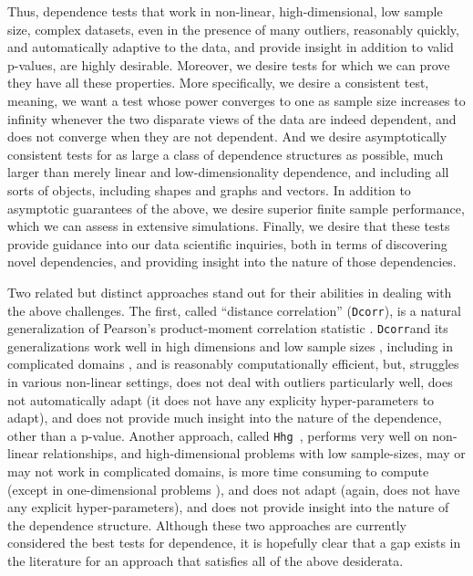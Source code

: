 \documentclass[11pt]{article}
\providecommand{\sct}[1]{{\sc \texttt{#1}}}
\newcommand{\Hhg}{\sct{Hhg}}
\newcommand{\Dcorr}{\sct{Dcorr}}
\begin{document}
Thus, dependence tests that work in non-linear, high-dimensional, low sample size, complex datasets, even in the presence of many outliers, reasonably quickly, and automatically adaptive to the data, and provide insight in addition to valid p-values, are highly desirable. Moreover, we desire tests for which we can prove they have all these properties. More specifically, we desire a consistent test, meaning, we want a test whose power converges to one as sample size increases to infinity whenever the two disparate views of the data are indeed dependent, and does not converge when they are not dependent. And we desire asymptotically consistent tests for as large a class of dependence structures as possible, much larger than merely linear and low-dimensionality dependence, and including all sorts of objects, including shapes and graphs and vectors.  In addition to asymptotic guarantees of the above, we desire superior finite sample performance, which we can assess in extensive simulations.  Finally, we desire that these tests provide guidance into our data scientific inquiries, both in terms of discovering novel dependencies, and providing insight into the nature of those dependencies.  




Two related but distinct approaches stand out for their abilities in dealing with the above challenges. The first, called ``distance correlation'' (\Dcorr), is a natural generalization of Pearson's product-moment correlation statistic \cite{RizzoSzekely2016}.  \Dcorr and its generalizations work well in high dimensions and low sample sizes \cite{??}, including in complicated domains \cite{Lyons2013}, and is reasonably computationally efficient, but, struggles in various non-linear settings, does not deal with outliers particularly well, does not automatically adapt (it does not have any explicity hyper-parameters to adapt), and does not provide much insight into the nature of the dependence, other than a p-value.  Another approach, called \Hhg~\cite{HellerGorfine2013}, performs very well on non-linear relationships, and high-dimensional problems with low sample-sizes, may or may not work in complicated domains, is more time consuming to compute (except in one-dimensional problems \cite{??}), and does not adapt (again, does not have any explicit hyper-parameters), and does not provide insight into the nature of the dependence structure.  Although these two approaches are currently considered the best tests for dependence, it is hopefully clear that a gap exists in the literature for an approach that satisfies all of the above desiderata. 
\end{document}
